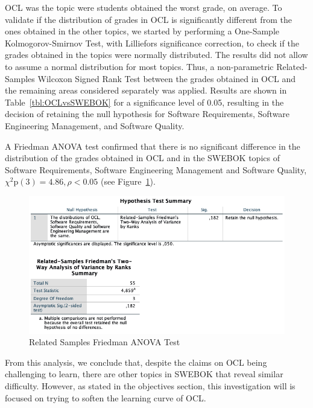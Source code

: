 OCL was the topic were students obtained the worst grade, on average. To validate if the distribution of grades in OCL is significantly different from the ones obtained in the other topics, we started by performing a One-Sample Kolmogorov-Smirnov Test, with Lilliefors significance correction, to check if the grades obtained in the topics were normally distributed. The results did not allow to assume a normal distribution for most topics. Thus, a non-parametric Related-Samples Wilcoxon Signed Rank Test between the grades obtained in OCL and the remaining areas considered separately was applied. Results are shown in Table~\ref{tbl:OCLvsSWEBOK} for a significance level of 0.05, resulting in the decision of retaining the null hypothesis for Software Requirements, Software Engineering Management, and Software Quality.



A Friedman ANOVA test confirmed that there is no significant difference in the distribution of the grades obtained in OCL and in the SWEBOK topics of Software Requirements, Software Engineering Management and Software Quality, $\chi^2\mathrm{p}(3) = 4.86, \rho < 0.05$ (see Figure~\ref{fig:FriedmandANOVA}). 

\begin{figure}[ht]
\centering
\includegraphics[width=1\textwidth]{Chapters/figures/6_Results/Section1/01_FriedmanANOVA.png}
\caption{Related Samples Friedman ANOVA Test}
\label{fig:FriedmandANOVA}
\end{figure}

From this analysis, we conclude that, despite the claims on OCL being challenging to learn, there are other topics in SWEBOK that reveal similar difficulty. However, as stated in the objectives section, this investigation will is focused on trying to soften the learning curve of OCL.


